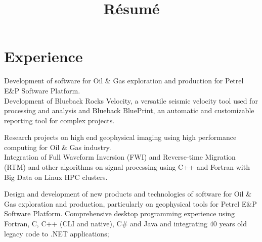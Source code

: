 \documentclass[11pt, a4paper, sans]{moderncv} %
\title{R\'esum\'e}
\begin{document}
\makecvtitle %















\section{Experience}

{
Development of software for Oil \& Gas exploration and production for Petrel E\&P Software Platform.\\ 
Development of Blueback Rocks Velocity, a versatile seismic velocity tool used for processing and analysis and Blueback BluePrint, an automatic and customizable reporting tool for complex projects.
}


{
Research projects on high end geophysical imaging using high performance computing for Oil \& Gas industry.\\
Integration of Full Waveform Inversion (FWI) and Reverse-time Migration (RTM) and other algorithms on signal processing using C++ and Fortran with Big Data on Linux HPC clusters.
}




{
Design and development of new products and technologies of software for Oil \& Gas exploration and production, particularly on geophysical tools for Petrel E\&P Software Platform. 
Comprehensive desktop programming experience using Fortran, C, C++ (CLI and native), C\# and Java and integrating 40 years old legacy code to .NET applications;
}
\end{document}
